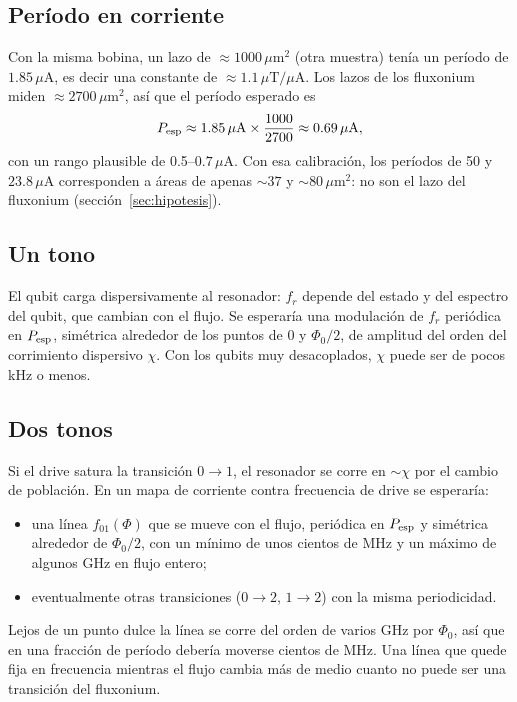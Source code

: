 \documentclass[11pt,a4paper]{article}
\newcommand{\uA}{\,\mu\mathrm{A}}
\newcommand{\fr}{f_r}
\begin{document}
\subsection{Período en corriente}

Con la misma bobina, un lazo de $\approx 1000\,\mu\mathrm{m}^2$ (otra muestra) tenía un período de $1.85\uA$, es decir
una constante de $\approx 1.1\,\mu\mathrm{T}/\mu\mathrm{A}$. Los lazos de los fluxonium miden
$\approx 2700\,\mu\mathrm{m}^2$, así que el período esperado es
\begin{equation}
  P_{\rm esp} \approx 1.85\uA \times \frac{1000}{2700} \approx 0.69\uA ,
\end{equation}
con un rango plausible de 0.5--$0.7\uA$. Con esa calibración, los períodos de 50 y $23.8\uA$ corresponden a
áreas de apenas $\sim 37$ y $\sim 80\,\mu\mathrm{m}^2$: no son el lazo del fluxonium (sección~\ref{sec:hipotesis}).

\subsection{Un tono}

El qubit carga dispersivamente al resonador: $\fr$ depende del estado y del espectro del qubit, que cambian con el
flujo. Se esperaría una modulación de $\fr$ periódica en $P_{\rm esp}$, simétrica alrededor de los puntos de
$0$ y $\Phi_0/2$, de amplitud del orden del corrimiento dispersivo $\chi$. Con los qubits muy desacoplados, $\chi$
puede ser de pocos kHz o menos.

\subsection{Dos tonos}

Si el drive satura la transición $0\to1$, el resonador se corre en $\sim\chi$ por el cambio de población. En un mapa
de corriente contra frecuencia de drive se esperaría:
\begin{itemize}
  \item una línea $f_{01}(\Phi)$ que se mueve con el flujo, periódica en $P_{\rm esp}$ y simétrica alrededor de
    $\Phi_0/2$, con un mínimo de unos cientos de MHz y un máximo de algunos GHz en flujo entero;
  \item eventualmente otras transiciones ($0\to2$, $1\to2$) con la misma periodicidad.
\end{itemize}
Lejos de un punto dulce la línea se corre del orden de varios GHz por $\Phi_0$, así que en una fracción de
período debería moverse cientos de MHz. Una línea que quede fija en frecuencia mientras el flujo cambia más de
medio cuanto no puede ser una transición del fluxonium.
\end{document}
